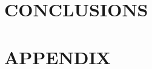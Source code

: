 \documentclass[letterpaper, 10 pt, conference]{ieeeconf}  %
\begin{document}
   


\section{CONCLUSIONS}








\section*{APPENDIX}
\end{document}
